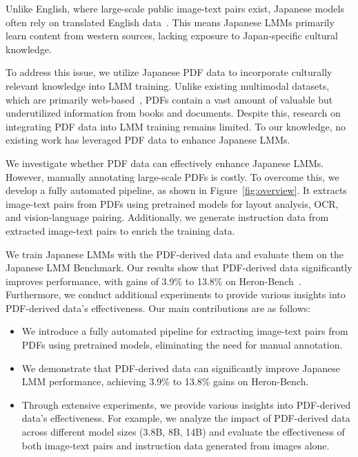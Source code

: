 Unlike English, where large-scale public image-text pairs exist, Japanese models often rely on translated English data~\cite{JapaneseInstructBLIPAlpha,JapaneseStableVLM,BlipJapaneseStableLM,inoue2024heron}. This means Japanese LMMs primarily learn content from western sources, lacking exposure to Japan-specific cultural knowledge.

To address this issue, we utilize Japanese PDF data to incorporate culturally relevant knowledge into LMM training. Unlike existing multimodal datasets, which are primarily web-based~\cite{coco,sharma2018conceptual,schuhmann2022laion}, PDFs contain a vast amount of valuable but underutilized information from books and documents. Despite this, research on integrating PDF data into LMM training remains limited. To our knowledge, no existing work has leveraged PDF data to enhance Japanese LMMs.

We investigate whether PDF data can effectively enhance Japanese LMMs. However, manually annotating large-scale PDFs is costly. To overcome this, we develop a fully automated pipeline, as shown in Figure~\ref{fig:overview}. 
It extracts image-text pairs from PDFs using pretrained models for layout analysis, OCR, and vision-language pairing. Additionally, we generate instruction data from extracted image-text pairs to enrich the training data.

We train Japanese LMMs with the PDF-derived data and evaluate them on the Japanese LMM Benchmark. Our results show that PDF-derived data significantly improves performance, with gains of 3.9\% to 13.8\% on Heron-Bench~\cite{inoue2024heron}. 
Furthermore, we conduct additional experiments to provide various insights into PDF-derived data's effectiveness. 
Our main contributions are as follows:
\begin{itemize}[noitemsep, topsep=0pt]
    \item We introduce a fully automated pipeline for extracting image-text pairs from PDFs using pretrained models, eliminating the need for manual annotation.
    \item We demonstrate that PDF-derived data can significantly improve Japanese LMM performance, achieving 3.9\% to 13.8\% gains on Heron-Bench.
    \item Through extensive experiments, we provide various insights into PDF-derived data's effectiveness. For example, we analyze the impact of PDF-derived data across different model sizes (3.8B, 8B, 14B) and evaluate the effectiveness of both image-text pairs and instruction data generated from images alone.
\end{itemize}



